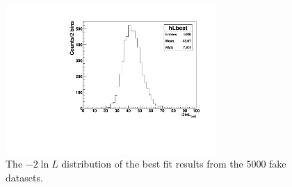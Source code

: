 \begin{figure}[!htb]
	\centering
	\includegraphics[width=8cm]{ensemble_lnLbest.pdf}
	\caption{The $-2\ln L$ distribution of the best fit results from the 5000 fake datasets. \label{poisson_fitLnL}}
\end{figure}

